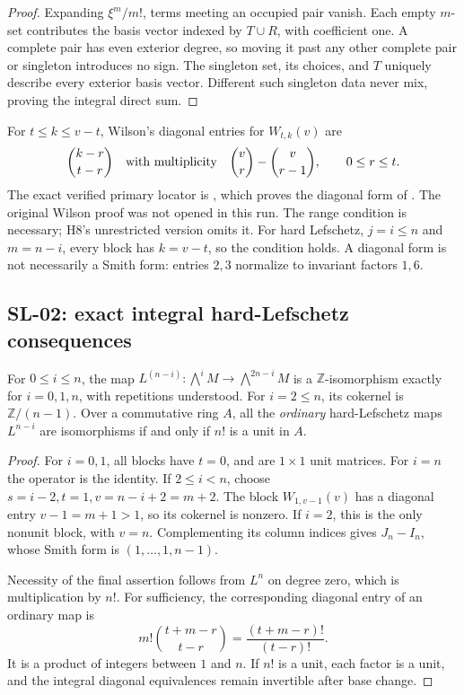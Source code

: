 \documentclass[11pt,a4paper]{article}
\theoremstyle{remark}
\begin{document}
\begin{proof}
Expanding $\xi^m/m!$, terms meeting an occupied pair vanish.  Each empty
$m$-set contributes the basis vector indexed by $T\cup R$, with coefficient
one.  A complete pair has even exterior degree, so moving it past any
other complete pair or singleton introduces no sign.  The singleton set,
its choices, and $T$ uniquely describe every exterior basis vector.
Different such singleton data never mix, proving the integral direct sum.
\end{proof}

For $t\le k\le v-t$, Wilson's diagonal entries for $W_{t,k}(v)$ are
\[
 \binom{k-r}{t-r}\quad\hbox{with multiplicity}\quad
 \binom vr-\binom v{r-1},\qquad 0\le r\le t.
\]
The exact verified primary locator is
\cite[Corollary 3, p.~10]{Ghorbani}, which proves the diagonal form of
\cite{Wilson}.  The original Wilson proof was not opened in this run.
The range condition is necessary; H8's unrestricted version omits it.
For hard Lefschetz, $j=i\le n$ and $m=n-i$, every block has $k=v-t$,
so the condition holds.  A diagonal form is not necessarily a Smith form:
entries $2,3$ normalize to invariant factors $1,6$.

\subsection{SL-02: exact integral hard-Lefschetz consequences}
\label{sl:integral}

For $0\le i\le n$, the map
$L^{(n-i)}:\bigwedge^iM\to\bigwedge^{2n-i}M$ is a
$\mathbb Z$-isomorphism exactly for $i=0,1,n$, with repetitions understood.
For $i=2\le n$, its cokernel is $\mathbb Z/(n-1)$.  Over a commutative
ring $A$, all the \emph{ordinary} hard-Lefschetz maps $L^{n-i}$ are
isomorphisms if and only if $n!$ is a unit in $A$.

\begin{proof}
For $i=0,1$, all blocks have $t=0$, and are $1\times1$ unit matrices.
For $i=n$ the operator is the identity.  If $2\le i<n$, choose
$s=i-2,t=1,v=n-i+2=m+2$.  The block $W_{1,v-1}(v)$ has a diagonal entry
$v-1=m+1>1$, so its cokernel is nonzero.  If $i=2$, this is the only
nonunit block, with $v=n$.  Complementing its column indices gives
$J_n-I_n$, whose Smith form is $(1,\ldots,1,n-1)$.

Necessity of the final assertion follows from $L^n$ on degree zero, which
is multiplication by $n!$.  For sufficiency, the corresponding diagonal
entry of an ordinary map is
\[
 m!\binom{t+m-r}{t-r}=\frac{(t+m-r)!}{(t-r)!}.
\]
It is a product of integers between $1$ and $n$.  If $n!$ is a unit,
each factor is a unit, and the integral diagonal equivalences remain
invertible after base change.
\end{proof}
\end{document}
